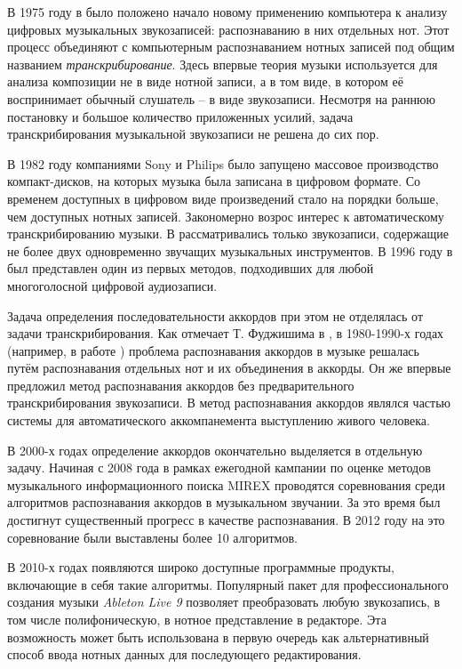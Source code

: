 В 1975 году в \cite{Moorer1975} было положено начало новому применению
компьютера к анализу цифровых музыкальных звукозаписей: распознаванию в них
отдельных нот. Этот процесс объединяют с компьютерным распознаванием нотных
записей под общим названием \emph{транскрибирование}. Здесь впервые теория
музыки используется для анализа композиции не в виде нотной записи, а в том
виде, в котором её воспринимает обычный слушатель -- в виде звукозаписи.
Несмотря на раннюю постановку и большое количество приложенных усилий, задача
транскрибирования музыкальной звукозаписи не решена до сих пор.

В 1982 году компаниями Sony и Philips было запущено массовое производство
компакт-дисков, на которых музыка была записана в цифровом формате. Со временем
доступных в цифровом виде произведений стало на порядки больше, чем доступных
нотных записей. Закономерно возрос интерес к автоматическому транскрибированию
музыки. В \cite{Moorer1975} рассматривались только звукозаписи, содержащие не
более двух одновременно звучащих музыкальных инструментов. В 1996 году в
\cite{Martin1996} был представлен один из первых методов, подходивших для любой
многоголосной цифровой аудиозаписи.

Задача определения последовательности аккордов при этом не отделялась от задачи
транскрибирования. Как отмечает Т. Фуджишима в \cite{Fujishima1999},
в 1980-1990-х годах (например, в работе \cite{Aono1998}) проблема распознавания
аккордов в музыке решалась путём распознавания отдельных нот и их объединения в
аккорды. Он же впервые предложил метод распознавания аккордов без
предварительного транскрибирования звукозаписи. В \cite{Aono1998} метод
распознавания аккордов являлся частью системы для автоматического
аккомпанемента выступлению живого человека.

В 2000-х годах определение аккордов окончательно выделяется в отдельную задачу.
Начиная с 2008 года в рамках ежегодной кампании по оценке методов музыкального
информационного поиска MIREX \cite{MirexHome} проводятся соревнования среди
алгоритмов распознавания аккордов в музыкальном звучании. За это время был
достигнут существенный прогресс в качестве распознавания. В 2012 году на это
соревнование были выставлены более 10 алгоритмов.

В 2010-х годах появляются широко доступные программные продукты, включающие в
себя такие алгоритмы. Популярный пакет для профессионального создания музыки
\emph{Ableton Live 9} \cite{AbletonLive} позволяет преобразовать любую
звукозапись, в том числе полифоническую, в нотное представление в редакторе. Эта
возможность может быть использована в первую очередь как альтернативный способ
ввода нотных данных для последующего редактирования.

